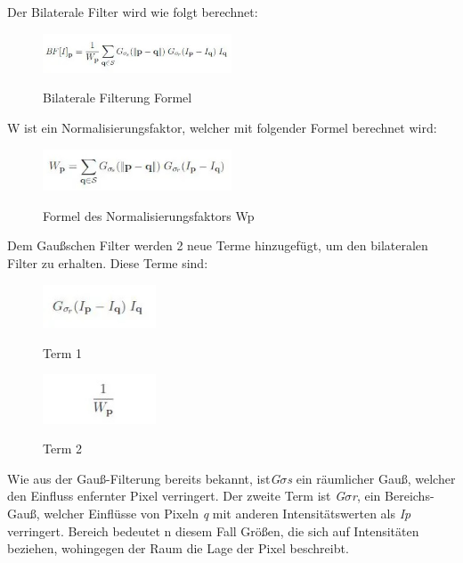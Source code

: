     Der Bilaterale Filter wird wie folgt berechnet:
    \begin{figure}[H]
        \centering
        \includegraphics[width=0.5\textwidth]{pics/Bilateral-Filtering-in-Python-OpenCV.jpeg}
        \caption{Bilaterale Filterung Formel}
        \cite{BilateralFormula1}
        \label{fig:anpr:bilat:1}
        \end{figure}
W ist ein Normalisierungsfaktor, welcher mit folgender Formel berechnet wird:
\begin{figure}[H]
    \centering
    \includegraphics[width=0.5\textwidth]{pics/Bilateral-Filtering-in-Python-OpenCV-Formula2.jpeg}
    \caption{Formel des Normalisierungsfaktors Wp}
    \cite{BilateralFormula2}
    \label{fig:anpr:bilat:2}
    \end{figure}
Dem Gaußschen Filter werden 2 neue Terme hinzugefügt, um den bilateralen Filter zu erhalten. Diese Terme sind:
 \begin{figure}[H]
    \centering
    \includegraphics[width=0.3\textwidth]{pics/Bilateral-Filtering-in-Python-OpenCV-Formula3.jpeg}
    \caption{Term 1}
    \cite{BilateralFormula3}
    \label{fig:anpr:bilat:3}
    \end{figure}
\begin{figure}[H]
        \centering
        \includegraphics[width=0.3\textwidth]{pics/Bilateral-Filtering-in-Python-OpenCV-Formula4.jpeg}
        \caption{Term 2}
        \cite{BilateralFormula4}
        \label{fig:anpr:bilat:4}
        \end{figure}
Wie aus der Gauß-Filterung bereits bekannt, ist\textit{G\(\sigma\)s} ein räumlicher Gauß, welcher den Einfluss enfernter Pixel verringert. Der zweite Term ist \textit{G\(\sigma\)r}, ein Bereichs-Gauß, welcher Einflüsse von Pixeln \textit{q} mit anderen Intensitätswerten als \textit{Ip} verringert. Bereich bedeutet n diesem Fall Größen, die sich auf Intensitäten beziehen, wohingegen der Raum die Lage der Pixel beschreibt.\\
